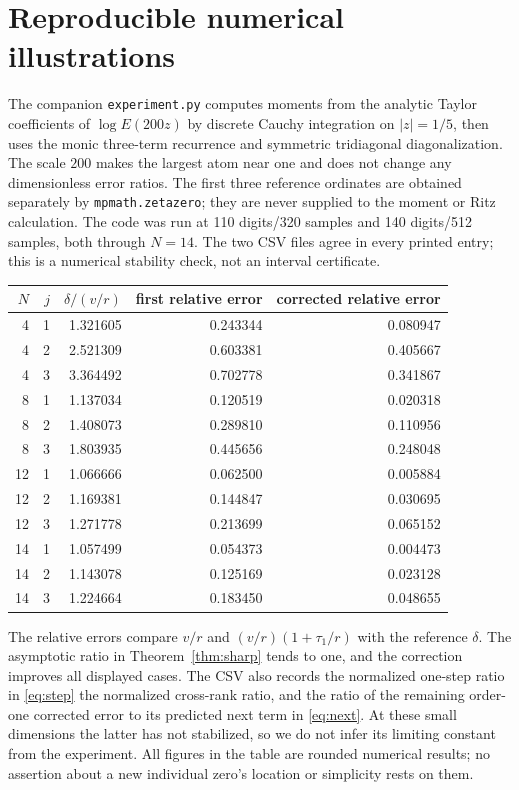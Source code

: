\documentclass[11pt]{article}
\theoremstyle{remark}\newtheorem{remark}[theorem]{Remark}
\begin{document}
\section{Reproducible numerical illustrations}
The companion \texttt{experiment.py} computes moments from the analytic Taylor coefficients of $\log E(200z)$ by discrete Cauchy integration on $|z|=1/5$, then uses the monic three-term recurrence and symmetric tridiagonal diagonalization. The scale $200$ makes the largest atom near one and does not change any dimensionless error ratios. The first three reference ordinates are obtained separately by \texttt{mpmath.zetazero}; they are never supplied to the moment or Ritz calculation. The code was run at 110 digits/320 samples and 140 digits/512 samples, both through $N=14$. The two CSV files agree in every printed entry; this is a numerical stability check, not an interval certificate.

\begin{center}
\small
\begin{tabular}{rrr r r}
\toprule
$N$ & $j$ & $\delta/(v/r)$ & first relative error & corrected relative error\\
\midrule
4 & 1 & 1.321605 & 0.243344 & 0.080947\\
4 & 2 & 2.521309 & 0.603381 & 0.405667\\
4 & 3 & 3.364492 & 0.702778 & 0.341867\\
8 & 1 & 1.137034 & 0.120519 & 0.020318\\
8 & 2 & 1.408073 & 0.289810 & 0.110956\\
8 & 3 & 1.803935 & 0.445656 & 0.248048\\
12 & 1 & 1.066666 & 0.062500 & 0.005884\\
12 & 2 & 1.169381 & 0.144847 & 0.030695\\
12 & 3 & 1.271778 & 0.213699 & 0.065152\\
14 & 1 & 1.057499 & 0.054373 & 0.004473\\
14 & 2 & 1.143078 & 0.125169 & 0.023128\\
14 & 3 & 1.224664 & 0.183450 & 0.048655\\
\bottomrule
\end{tabular}
\end{center}
The relative errors compare $v/r$ and $(v/r)(1+\tau_1/r)$ with the reference $\delta$. The asymptotic ratio in Theorem~\ref{thm:sharp} tends to one, and the correction improves all displayed cases. The CSV also records the normalized one-step ratio in \eqref{eq:step} the normalized cross-rank ratio, and the ratio of the remaining order-one corrected error to its predicted next term in \eqref{eq:next}. At these small dimensions the latter has not stabilized, so we do not infer its limiting constant from the experiment. All figures in the table are rounded numerical results; no assertion about a new individual zero's location or simplicity rests on them.
\end{document}
